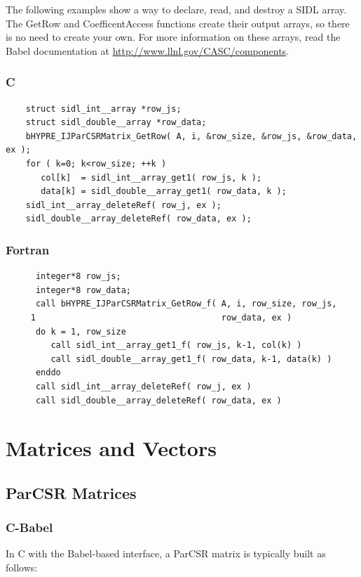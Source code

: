 The following examples show a way to declare, read, and destroy a SIDL
array.  The GetRow and CoefficentAccess functions create their output
arrays, so there is no need to create your own.  For more information
on these arrays, read the Babel documentation at
\url{http://www.llnl.gov/CASC/components}.


\subsubsection{C}
\begin{verbatim}
    struct sidl_int__array *row_js;
    struct sidl_double__array *row_data;
    bHYPRE_IJParCSRMatrix_GetRow( A, i, &row_size, &row_js, &row_data, ex );
    for ( k=0; k<row_size; ++k )
       col[k]  = sidl_int__array_get1( row_js, k );
       data[k] = sidl_double__array_get1( row_data, k );
    sidl_int__array_deleteRef( row_j, ex );
    sidl_double__array_deleteRef( row_data, ex );
\end{verbatim}
\subsubsection{Fortran}
\begin{verbatim}
      integer*8 row_js;
      integer*8 row_data;
      call bHYPRE_IJParCSRMatrix_GetRow_f( A, i, row_size, row_js,
     1                                     row_data, ex )
      do k = 1, row_size
         call sidl_int__array_get1_f( row_js, k-1, col(k) )
         call sidl_double__array_get1_f( row_data, k-1, data(k) )
      enddo
      call sidl_int__array_deleteRef( row_j, ex )
      call sidl_double__array_deleteRef( row_data, ex )
\end{verbatim}


\section{Matrices and Vectors}

\subsection{ParCSR Matrices}

\subsubsection{C-Babel}
In C with the Babel-based interface, a ParCSR matrix is typically built as follows:

